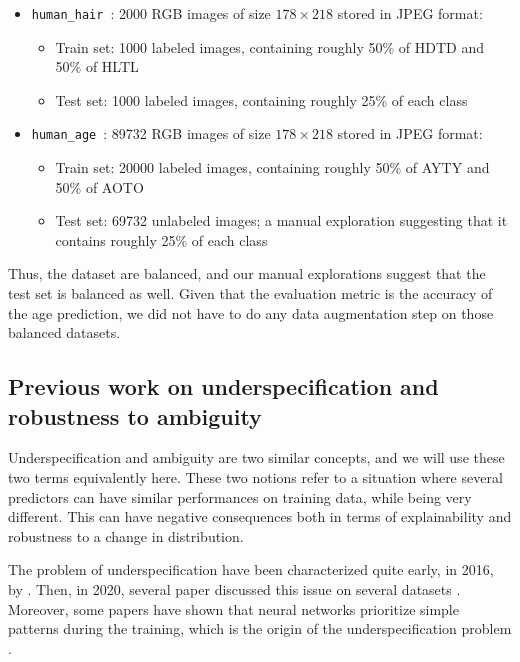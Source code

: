 \documentclass[sigconf, nonacm]{acmart}
\newcommand{\humanAge}{\texttt{human\_age}\ }
\newcommand{\humanHair}{\texttt{human\_hair}\ }
\begin{document}
\begin{itemize}
    \item \humanHair: 2000 RGB images of size $178\times218$ stored in JPEG format:
    \begin{itemize}
        \item Train set: 1000 labeled images, containing roughly 50\% of HDTD and 50\% of HLTL
        \item Test set: 1000 labeled images, containing roughly 25\% of each class
    \end{itemize}
    \item \humanAge: 89732 RGB images of size $178\times218$ stored in JPEG format:
    \begin{itemize}
        \item Train set: 20000 labeled images, containing roughly 50\% of AYTY and 50\% of AOTO
        \item Test set: 69732 unlabeled images; a manual exploration suggesting that it contains roughly 25\% of each class
    \end{itemize}
\end{itemize}

Thus, the dataset are balanced, and our manual explorations suggest that the test set is balanced as well. Given that the evaluation metric is the accuracy of the age prediction, we did not have to do any data augmentation step on those balanced datasets.

\subsection{Previous work on underspecification and robustness to ambiguity}

Underspecification and ambiguity are two similar concepts, and we will use these two terms equivalently here. These two notions refer to a situation where several predictors can have similar performances on training data, while being very different. This can have negative consequences both in terms of explainability and robustness to a change in distribution.

The problem of underspecification have been characterized quite early, in 2016, by \cite{amodei_concrete_2016}. Then, in 2020, several paper discussed this issue on several datasets \cite{damour_underspecification_2020, oakden-rayner_hidden_2019}. Moreover, some papers have shown that neural networks prioritize simple patterns during the training, which is the origin of the underspecification problem \cite{arpit_closer_2017, gunasekar_implicit_2019}.
\end{document}
